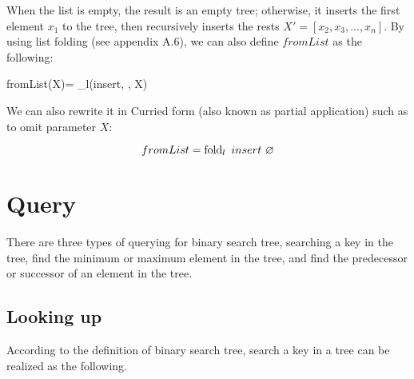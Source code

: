 \documentclass[b5paper]{article}
\begin{document}
When the list is empty, the result is an empty tree; otherwise, it inserts the first element $x_1$ to the tree, then recursively inserts the rests $X' = [x_2, x_3, ..., x_n]$. By using list folding\cite{wiki-fold} (see appendix A.6), we can also define $fromList$ as the following:

\be
  fromList(X)= \fold_l(insert, \nil, X)
\ee

We can also rewrite it in Curried form\cite{curry} (also known as partial application) such as to omit parameter $X$:

\[
  fromList = \fold_l\ insert\ \nil
\]

\begin{Exercise}



\end{Exercise}

\section{Query}

There are three types of querying for binary search tree, searching
a key in the tree, find the minimum or maximum element in the tree,
and find the predecessor or successor of an element in the tree.

\subsection{Looking up}
According to the definition of binary search tree, search
a key in a tree can be realized as the following.
\end{document}
